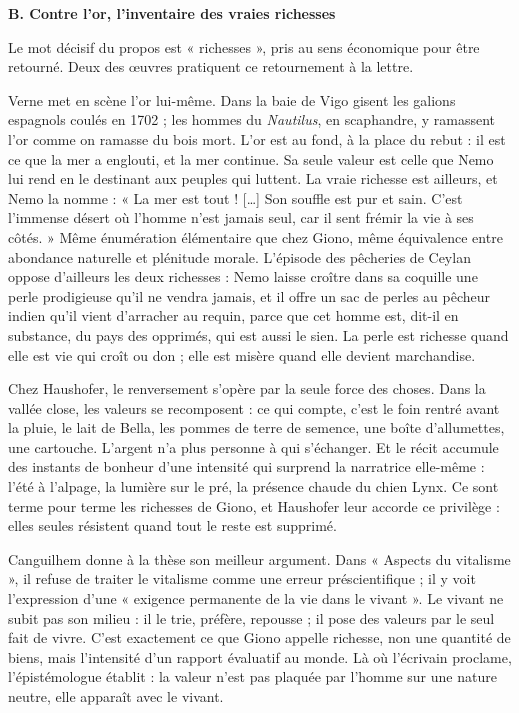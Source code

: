 \documentclass[11pt,a4paper]{article}
\begin{document}
\textbf{B. Contre l'or, l'inventaire des vraies richesses}

Le mot décisif du propos est « richesses », pris au sens économique pour être retourné. Deux des œuvres pratiquent ce retournement à la lettre.

Verne met en scène l'or lui-même. Dans la baie de Vigo gisent les galions espagnols coulés en 1702 ; les hommes du \emph{Nautilus}, en scaphandre, y ramassent l'or comme on ramasse du bois mort. L'or est au fond, à la place du rebut : il est ce que la mer a englouti, et la mer continue. Sa seule valeur est celle que Nemo lui rend en le destinant aux peuples qui luttent. La vraie richesse est ailleurs, et Nemo la nomme : « La mer est tout ! {[}\ldots{]} Son souffle est pur et sain. C'est l'immense désert où l'homme n'est jamais seul, car il sent frémir la vie à ses côtés. » Même énumération élémentaire que chez Giono, même équivalence entre abondance naturelle et plénitude morale. L'épisode des pêcheries de Ceylan oppose d'ailleurs les deux richesses : Nemo laisse croître dans sa coquille une perle prodigieuse qu'il ne vendra jamais, et il offre un sac de perles au pêcheur indien qu'il vient d'arracher au requin, parce que cet homme est, dit-il en substance, du pays des opprimés, qui est aussi le sien. La perle est richesse quand elle est vie qui croît ou don ; elle est misère quand elle devient marchandise.

Chez Haushofer, le renversement s'opère par la seule force des choses. Dans la vallée close, les valeurs se recomposent : ce qui compte, c'est le foin rentré avant la pluie, le lait de Bella, les pommes de terre de semence, une boîte d'allumettes, une cartouche. L'argent n'a plus personne à qui s'échanger. Et le récit accumule des instants de bonheur d'une intensité qui surprend la narratrice elle-même : l'été à l'alpage, la lumière sur le pré, la présence chaude du chien Lynx. Ce sont terme pour terme les richesses de Giono, et Haushofer leur accorde ce privilège : elles seules résistent quand tout le reste est supprimé.

Canguilhem donne à la thèse son meilleur argument. Dans « Aspects du vitalisme », il refuse de traiter le vitalisme comme une erreur préscientifique ; il y voit l'expression d'une « exigence permanente de la vie dans le vivant ». Le vivant ne subit pas son milieu : il le trie, préfère, repousse ; il pose des valeurs par le seul fait de vivre. C'est exactement ce que Giono appelle richesse, non une quantité de biens, mais l'intensité d'un rapport évaluatif au monde. Là où l'écrivain proclame, l'épistémologue établit : la valeur n'est pas plaquée par l'homme sur une nature neutre, elle apparaît avec le vivant.
\end{document}
